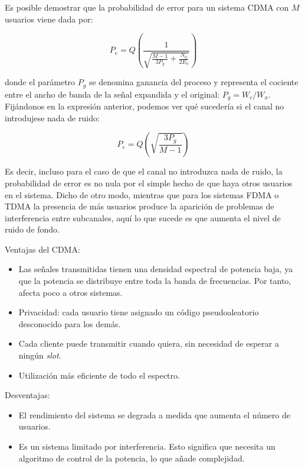 \documentclass[es,apuntes]{uah}
\begin{document}
Es posible demostrar que la probabilidad de error para un sistema CDMA con $M$ usuarios viene dada por:

\begin{displaymath}
	P_e = Q \left ( \frac{1}{\sqrt{\frac{M-1}{3P_g} + \frac{N_0}{2E_b}}} \right )
\end{displaymath}

donde el parámetro $P_g$ se denomina ganancia del proceso y representa el cociente entre el ancho de banda de la señal expandida y el original: $P_g = W_c/W_x$. Fijándonos en la expresión anterior, podemos ver qué sucedería si el canal no introdujese nada de ruido:

\begin{displaymath}
	P_e = Q \left ( \sqrt{\frac{3 P_g}{M-1}} \right )
\end{displaymath}

Es decir, incluso para el caso de que el canal no introduzca nada de ruido, la probabilidad de error es no nula por el simple hecho de que haya otros usuarios en el sistema. Dicho de otro modo, mientras que para los sistemas FDMA o TDMA la presencia de más usuarios produce la aparición de problemas de interferencia entre subcanales, aquí lo que sucede es que aumenta el nivel de ruido de fondo. 

Ventajas del CDMA:

\begin{itemize}
	\item Las señales transmitidas tienen una densidad espectral de potencia baja, ya que la potencia se distribuye entre toda la banda de frecuencias. Por tanto, afecta poco a otros sistemas. 
	\item Privacidad: cada usuario tiene asignado un código pseudoaleatorio desconocido para los demás. 
	\item Cada cliente puede transmitir cuando quiera, sin necesidad de esperar a ningún \emph{slot}.
	\item Utilización más eficiente de todo el espectro.
\end{itemize}

Desventajas:

\begin{itemize}
	\item El rendimiento del sistema se degrada a medida que aumenta el número de usuarios. 
	\item Es un sistema limitado por interferencia. Esto significa que necesita un algoritmo de control de la potencia, lo que añade complejidad.
\end{itemize}
\end{document}
